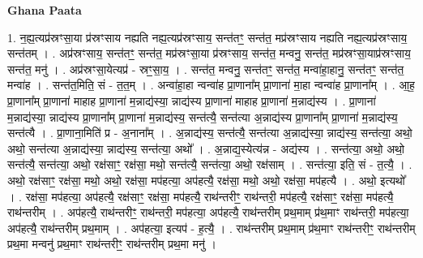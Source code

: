 \documentclass[17pt]{extarticle}
\begin{document}
\textbf{Ghana Paata } \newline

1. न॒ह्य॒त्यप्र॑स्रꣳसा॒या प्र॑स्रꣳसाय नह्यति नह्य॒त्यप्र॑स्रꣳसाय॒ सन्त॑तꣳ॒॒ सन्त॑त॒ मप्र॑स्रꣳसाय नह्यति नह्य॒त्यप्र॑स्रꣳसाय॒ सन्त॑तम् । . अप्र॑स्रꣳसाय॒ सन्त॑तꣳ॒॒ सन्त॑त॒ मप्र॑स्रꣳसा॒या प्र॑स्रꣳसाय॒ सन्त॑त॒ मन्वनु॒ सन्त॑त॒ मप्र॑स्रꣳसा॒याप्र॑स्रꣳसाय॒ सन्त॑त॒ मनु॑ । . अप्र॑स्रꣳसा॒येत्यप्र॑ - स्रꣳ॒॒सा॒य॒ । . सन्त॑त॒ मन्वनु॒ सन्त॑तꣳ॒॒ सन्त॑त॒ मन्वा॑हा॒हानु॒ सन्त॑तꣳ॒॒ सन्त॑त॒ मन्वा॑ह । . सन्त॑त॒मिति॒ सं - त॒त॒म् । . अन्वा॑हा॒हा न्वन्वा॑ह प्रा॒णाना᳚म् प्रा॒णाना॑ मा॒हा न्वन्वा॑ह प्रा॒णाना᳚म् । . आ॒ह॒ प्रा॒णाना᳚म् प्रा॒णाना॑ माहाह प्रा॒णाना॑ म॒न्नाद्य॑स्या॒ न्नाद्य॑स्य प्रा॒णाना॑ माहाह प्रा॒णाना॑ म॒न्नाद्य॑स्य । . प्रा॒णाना॑ म॒न्नाद्य॑स्या॒ न्नाद्य॑स्य प्रा॒णाना᳚म् प्रा॒णाना॑ म॒न्नाद्य॑स्य॒ सन्त॑त्यै॒ सन्त॑त्या अ॒न्नाद्य॑स्य प्रा॒णाना᳚म् प्रा॒णाना॑ म॒न्नाद्य॑स्य॒ सन्त॑त्यै । . प्रा॒णाना॒मिति॑ प्र - अ॒नाना᳚म् । . अ॒न्नाद्य॑स्य॒ सन्त॑त्यै॒ सन्त॑त्या अ॒न्नाद्य॑स्या॒ न्नाद्य॑स्य॒ सन्त॑त्या॒ अथो॒ अथो॒ सन्त॑त्या अ॒न्नाद्य॑स्या॒ न्नाद्य॑स्य॒ सन्त॑त्या॒ अथो᳚ । . अ॒न्नाद्य॒स्येत्य॑न्न - अद्य॑स्य । . सन्त॑त्या॒ अथो॒ अथो॒ सन्त॑त्यै॒ सन्त॑त्या॒ अथो॒ रक्ष॑साꣳ॒॒ रक्ष॑सा॒ मथो॒ सन्त॑त्यै॒ सन्त॑त्या॒ अथो॒ रक्ष॑साम् । . सन्त॑त्या॒ इति॒ सं - त॒त्यै॒ । . अथो॒ रक्ष॑साꣳ॒॒ रक्ष॑सा॒ मथो॒ अथो॒ रक्ष॑सा॒ मप॑हत्या॒ अप॑हत्यै॒ रक्ष॑सा॒ मथो॒ अथो॒ रक्ष॑सा॒ मप॑हत्यै । . अथो॒ इत्यथो᳚ । . रक्ष॑सा॒ मप॑हत्या॒ अप॑हत्यै॒ रक्ष॑साꣳ॒॒ रक्ष॑सा॒ मप॑हत्यै॒ राथ॑न्तरीꣳ॒॒ राथ॑न्तरी॒ मप॑हत्यै॒ रक्ष॑साꣳ॒॒ रक्ष॑सा॒ मप॑हत्यै॒ राथ॑न्तरीम् । . अप॑हत्यै॒ राथ॑न्तरीꣳ॒॒ राथ॑न्तरी॒ मप॑हत्या॒ अप॑हत्यै॒ राथ॑न्तरीम् प्रथ॒माम् प्र॑थ॒माꣳ राथ॑न्तरी॒ मप॑हत्या॒ अप॑हत्यै॒ राथ॑न्तरीम् प्रथ॒माम् । . अप॑हत्या॒ इत्यप॑ - ह॒त्यै॒ । . राथ॑न्तरीम् प्रथ॒माम् प्र॑थ॒माꣳ राथ॑न्तरीꣳ॒॒ राथ॑न्तरीम् प्रथ॒मा मन्वनु॑ प्रथ॒माꣳ राथ॑न्तरीꣳ॒॒ राथ॑न्तरीम् प्रथ॒मा मनु॑ । \newline
\end{document}
